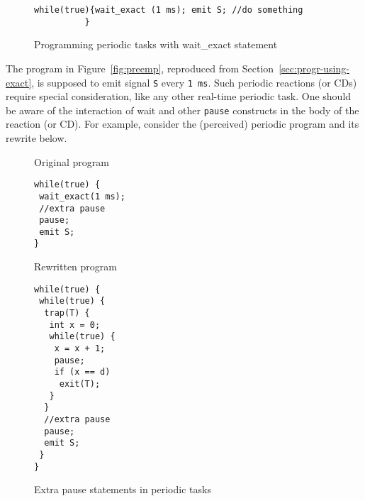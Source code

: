 


\begin{figure}[h!]
  \centering
	\vspace{-10pt}
        \begin{lstlisting}[style=sysj,basicstyle=\normalsize\ttfamily,morekeywords={emit,trap,pause,exit,wait_exact}]
          while(true){wait_exact (1 ms); emit S; //do something
          }
 \end{lstlisting}
  \caption{Programming periodic tasks with wait\_exact statement}
  \label{fig:periodic}
	\vspace{-10pt}
\end{figure}

The program in Figure~\ref{fig:preemp}, reproduced from
Section~\ref{sec:progr-using-exact}, is supposed to emit signal
\texttt{S} every \texttt{1 ms}. Such periodic reactions (or CDs) require
special consideration, like any other real-time periodic task. One
should be aware of the interaction of wait and other \texttt{pause}
constructs in the body of the reaction (or CD). For example, consider
the (perceived) periodic program and its rewrite below.

\begin{figure}[h!]
  \centering
  \begin{SubFloat}{\label{pp:a}Original program}
    \centering
			\begin{lstlisting}[style=sysj,basicstyle=\normalsize\ttfamily,morekeywords={emit,trap,pause,exit,wait_exact}]
while(true) {
 wait_exact(1 ms);
 //extra pause
 pause;
 emit S;
}
\end{lstlisting}
\end{SubFloat}
\hspace{9pt}
  \begin{SubFloat}{\label{pp:b}Rewritten program}
			\begin{lstlisting}[style=sysj,basicstyle=\normalsize\ttfamily,morekeywords={emit,trap,pause,exit,delay}]
while(true) {
 while(true) { 
  trap(T) {
   int x = 0;
   while(true) {
    x = x + 1;
    pause;
    if (x == d)
     exit(T);
   }
  }
  //extra pause
  pause;
  emit S;
 }
}
\end{lstlisting}
  \end{SubFloat}
\caption{Extra pause statements in periodic tasks}
  \label{fig:periodic2}
\end{figure}

